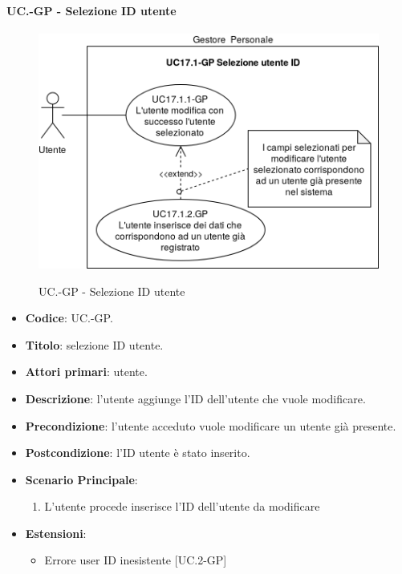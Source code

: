 	\paragraph{UC\theuccount.\thesubuccount-GP - Selezione ID utente}
		\begin{figure}[H]
			\centering
			\includegraphics[width=\columnwidth]{img/casi_d'uso/UC17_1.png}\\
			\caption{UC\theuccount.\thesubuccount-GP - Selezione ID utente}
		\end{figure}
		\begin{itemize}
			\item \textbf{Codice}: UC\theuccount.\thesubuccount-GP.
			\item \textbf{Titolo}: selezione ID utente.
			\item \textbf{Attori primari}: utente.
			\item \textbf{Descrizione}: l'utente aggiunge l'ID dell'utente che vuole modificare.
			\item \textbf{Precondizione}: l'utente acceduto vuole modificare un utente già presente.
			\item \textbf{Postcondizione}: l'ID utente è stato inserito.
			\item \textbf{Scenario Principale}:
			\begin{enumerate}
				\item L'utente procede inserisce l'ID dell'utente da modificare
			\end{enumerate}
			\item \textbf{Estensioni}:
			\begin{itemize}
				\item Errore user ID inesistente [UC\theuccount.2-GP]
			\end{itemize}
		\end{itemize}
		
